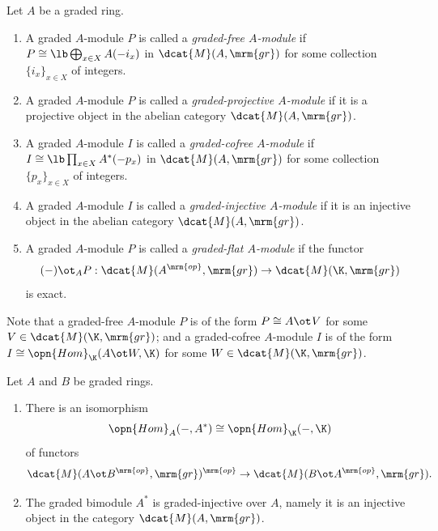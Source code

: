 \begin{dfn}  \label{dfn:3740}
Let $A$ be a graded ring.  
\begin{enumerate}
\item A graded $A$-module $P$ is called a {\em graded-free $A$-module}%
if
$P \cong \lb \bigoplus_{x \in X} A(-i_x)$
in $\dcat{M}(A, \mrm{gr})$
for some collection $\{ i_x \}_{x \in X}$ of integers.

\item A graded $A$-module $P$ is called a 
{\em graded-projective $A$-module}%
if it is a projective object in the abelian category 
$\dcat{M}(A, \mrm{gr})$.

\item  A graded $A$-module $I$ is called a 
{\em graded-cofree $A$-module}%
if
$I \cong \lb \prod_{x \in X} A^*(-p_x)$
in $\dcat{M}(A, \mrm{gr})$ 
for some collection $\{ p_x \}_{x \in X}$ of integers.

\item A graded $A$-module $I$ is called a 
{\em graded-injective $A$-module}%
if it is an injective object in the abelian category $\dcat{M}(A, \mrm{gr})$.

\item A graded $A$-module $P$ is called a {\em graded-flat $A$-module} 
if the functor 
\[ (-) \ot_A P : \dcat{M}(A^{\mrm{op}}, \mrm{gr}) \to
\dcat{M}(\K, \mrm{gr}) \]
is exact. 
\end{enumerate}
\end{dfn}

Note that a graded-free $A$-module $P$ is of the form 
$P \cong A \ot_{} V$ for some $V \in \dcat{M}(\K, \mrm{gr})$;
and a graded-cofree $A$-module $I$ is of the form 
$I \cong \opn{Hom}_{\K}(A \ot W, \K)$ for some $W \in \dcat{M}(\K, \mrm{gr})$.

\begin{prop} \label{prop:3795}
Let $A$ and $B$ be graded rings.
\begin{enumerate}
\item There is an isomorphism 
\[ \opn{Hom}_{A}(-, A^*) \cong \opn{Hom}_{\K}(-, \K)  \]
of functors 
\[ \dcat{M}(A \ot B^{\mrm{op}}, \mrm{gr})^{\mrm{op}} \to 
\dcat{M}(B \ot A^{\mrm{op}}, \mrm{gr}) . \]

\item The graded bimodule $A^*$ is graded-injective over $A$, 
namely it is an injective object in the category
$\dcat{M}(A, \mrm{gr})$. 
\end{enumerate}
\end{prop}


